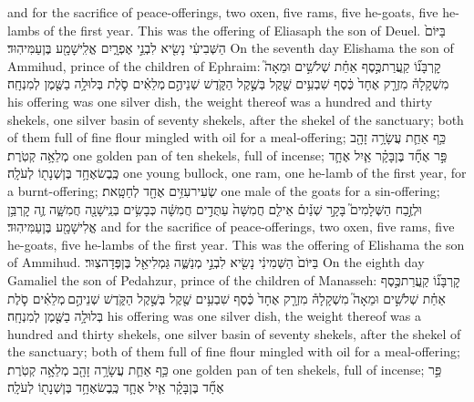 \documentclass[11pt, openany]{book}
\begin{document}
{and for the sacrifice of peace-offerings, two oxen, five rams, five he-goats, five he-lambs of the first year. This was the offering of Eliasaph the son of Deuel.}
{בַּיּוֹם֙ הַשְּׁבִיעִ֔י נָשִׂ֖יא לִבְנֵ֣י אֶפְרָ֑יִם אֱלִֽישָׁמָ֖ע בֶּן\maqqaf עַמִּיהֽוּד׃}
{On the seventh day Elishama the son of Ammihud, prince of the children of Ephraim:}
{קׇרְבָּנ֞וֹ קַֽעֲרַת\maqqaf כֶּ֣סֶף אַחַ֗ת שְׁלֹשִׁ֣ים וּמֵאָה֮ מִשְׁקָלָהּ֒ מִזְרָ֤ק אֶחָד֙ כֶּ֔סֶף שִׁבְעִ֥ים שֶׁ֖קֶל בְּשֶׁ֣קֶל הַקֹּ֑דֶשׁ שְׁנֵיהֶ֣ם \legarmeh  מְלֵאִ֗ים סֹ֛לֶת בְּלוּלָ֥ה בַשֶּׁ֖מֶן לְמִנְחָֽה׃}
{his offering was one silver dish, the weight thereof was a hundred and thirty shekels, one silver basin of seventy shekels, after the shekel of the sanctuary; both of them full of fine flour mingled with oil for a meal-offering;}
{כַּ֥ף אַחַ֛ת עֲשָׂרָ֥ה זָהָ֖ב מְלֵאָ֥ה קְטֹֽרֶת׃}
{one golden pan of ten shekels, full of incense;}
{פַּ֣ר אֶחָ֞ד בֶּן\maqqaf בָּקָ֗ר אַ֧יִל אֶחָ֛ד כֶּֽבֶשׂ\maqqaf אֶחָ֥ד בֶּן\maqqaf שְׁנָת֖וֹ לְעֹלָֽה׃}
{one young bullock, one ram, one he-lamb of the first year, for a burnt-offering;}
{שְׂעִיר\maqqaf עִזִּ֥ים אֶחָ֖ד לְחַטָּֽאת׃}
{one male of the goats for a sin-offering;}
{וּלְזֶ֣בַח הַשְּׁלָמִים֮ בָּקָ֣ר שְׁנַ֒יִם֒ אֵילִ֤ם חֲמִשָּׁה֙ עַתֻּדִ֣ים חֲמִשָּׁ֔ה כְּבָשִׂ֥ים בְּנֵֽי\maqqaf שָׁנָ֖ה חֲמִשָּׁ֑ה זֶ֛ה קׇרְבַּ֥ן אֱלִישָׁמָ֖ע בֶּן\maqqaf עַמִּיהֽוּד׃ \petucha }
{and for the sacrifice of peace-offerings, two oxen, five rams, five he-goats, five he-lambs of the first year. This was the offering of Elishama the son of Ammihud.}
{בַּיּוֹם֙ הַשְּׁמִינִ֔י נָשִׂ֖יא לִבְנֵ֣י מְנַשֶּׁ֑ה גַּמְלִיאֵ֖ל בֶּן\maqqaf פְּדָהצֽוּר׃}
{On the eighth day Gamaliel the son of Pedahzur, prince of the children of Manasseh:}
{קׇרְבָּנ֞וֹ קַֽעֲרַת\maqqaf כֶּ֣סֶף אַחַ֗ת שְׁלֹשִׁ֣ים וּמֵאָה֮ מִשְׁקָלָהּ֒ מִזְרָ֤ק אֶחָד֙ כֶּ֔סֶף שִׁבְעִ֥ים שֶׁ֖קֶל בְּשֶׁ֣קֶל הַקֹּ֑דֶשׁ שְׁנֵיהֶ֣ם \legarmeh  מְלֵאִ֗ים סֹ֛לֶת בְּלוּלָ֥ה בַשֶּׁ֖מֶן לְמִנְחָֽה׃}
{his offering was one silver dish, the weight thereof was a hundred and thirty shekels, one silver basin of seventy shekels, after the shekel of the sanctuary; both of them full of fine flour mingled with oil for a meal-offering;}
{כַּ֥ף אַחַ֛ת עֲשָׂרָ֥ה זָהָ֖ב מְלֵאָ֥ה קְטֹֽרֶת׃}
{one golden pan of ten shekels, full of incense;}
{פַּ֣ר אֶחָ֞ד בֶּן\maqqaf בָּקָ֗ר אַ֧יִל אֶחָ֛ד כֶּֽבֶשׂ\maqqaf אֶחָ֥ד בֶּן\maqqaf שְׁנָת֖וֹ לְעֹלָֽה׃}
\end{document}
